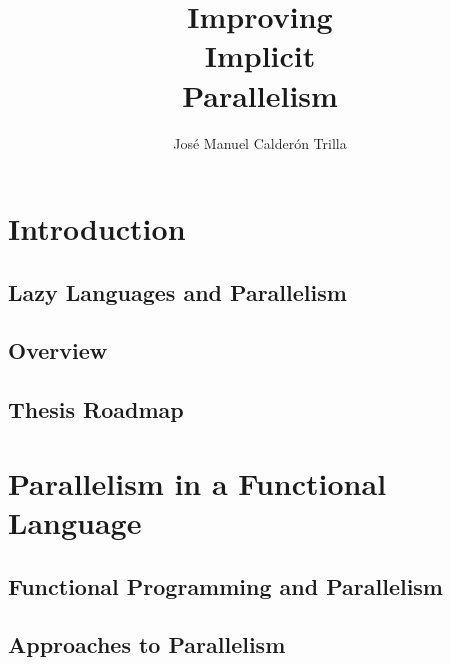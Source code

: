 \documentclass[justified, twoside, a4paper, symmetric]{tufte-book}
\title{Improving \\
       Implicit  \\
       Parallelism}
\author{Jos\'{e} Manuel Calder\'{o}n Trilla}
\newcommand{\blankpage}{\newpage\hbox{}\thispagestyle{empty}\newpage}
\begin{document}
\frontmatter


\maketitle

\tableofcontents
\listoffigures
\listoftables

\mainmatter

\chapter{Introduction}

    
    
    \section{Lazy Languages and Parallelism}
    

    \section{Overview}
    

    \section{Thesis Roadmap}

\chapter{Parallelism in a Functional Language}

    

    \section{Functional Programming and Parallelism}
    

    \section{Approaches to Parallelism}
    
    
\end{document}
